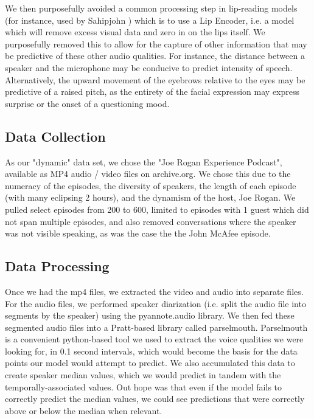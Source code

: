 \documentclass[10pt,twocolumn,letterpaper]{article}
\begin{document}
We then purposefully avoided a common processing step in lip-reading models (for instance, used by Sahipjohn \etal \cite{RobustL2S} )  which is to use a Lip Encoder, i.e. a model which will remove excess visual data and zero in on the lips itself. We purposefully removed this to allow for the capture of other information that may be predictive of these other audio qualities. For instance, the distance between a speaker and the microphone may be conducive to predict intensity of speech. Alternatively, the upward movement of the eyebrows relative to the eyes may be predictive of a raised pitch, as the entirety of the facial expression may express surprise or the onset of a questioning mood.   

\subsection{Data Collection}

As our "dynamic" data set, we chose the "Joe Rogan Experience Podcast", available as MP4 audio / video files on archive.org. We chose this due to the numeracy of the episodes, the diversity of speakers, the length of each episode (with many eclipsing 2 hours), and the dynamism of the host, Joe Rogan. We pulled select episodes from 200 to 600, limited to episodes with 1 guest which did not span multiple episodes, and also removed conversations where the speaker was not visible speaking, as was the case the the John McAfee episode.

\subsection{Data Processing}

Once we had the mp4 files, we extracted the video and audio into separate files. For the audio files, we performed speaker diarization (i.e. split the audio file into segments by the speaker) using the pyannote.audio library\cite{Bredin23}. We then fed these segmented audio files into a Pratt\cite{Pratt}-based library called parselmouth\cite{Parselmouth}.  Parselmouth is a convenient python-based tool we used to extract the voice qualities we were looking for, in 0.1 second intervals, which would become the basis for the data points our model would attempt to predict. We also accumulated this data to create speaker median values, which we would predict in tandem with the temporally-associated values. Out hope was that even if the model fails to correctly predict the median values, we could see predictions that were correctly above or below the median when relevant. 
\end{document}
